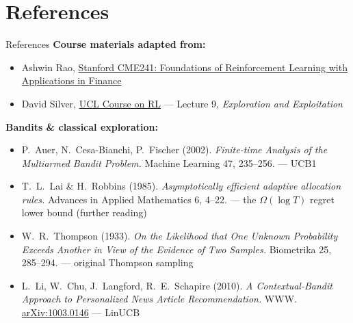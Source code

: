 \section{References}
\begin{frame}[allowframebreaks]{References}
\textbf{Course materials adapted from:}
\begin{itemize}
    \item Ashwin Rao, \href{https://cme241.stanford.edu/}{Stanford CME241: Foundations of Reinforcement Learning with Applications in Finance}
    \item David Silver, \href{https://www.davidsilver.uk/teaching/}{UCL Course on RL} --- Lecture 9, \emph{Exploration and Exploitation}
\end{itemize}

\textbf{Bandits \& classical exploration:}
\begin{itemize}
    \item P.~Auer, N.~Cesa-Bianchi, P.~Fischer (2002). \emph{Finite-time Analysis of the Multiarmed Bandit Problem.} Machine Learning 47, 235--256. --- UCB1
    \item T.~L.~Lai \& H.~Robbins (1985). \emph{Asymptotically efficient adaptive allocation rules.} Advances in Applied Mathematics 6, 4--22. --- the $\Omega(\log T)$ regret lower bound (further reading)
    \item W.~R.~Thompson (1933). \emph{On the Likelihood that One Unknown Probability Exceeds Another in View of the Evidence of Two Samples.} Biometrika 25, 285--294. --- original Thompson sampling
    \item L.~Li, W.~Chu, J.~Langford, R.~E.~Schapire (2010). \emph{A Contextual-Bandit Approach to Personalized News Article Recommendation.} WWW. \href{https://arxiv.org/abs/1003.0146}{arXiv:1003.0146} --- LinUCB
\end{itemize}


\end{frame}
